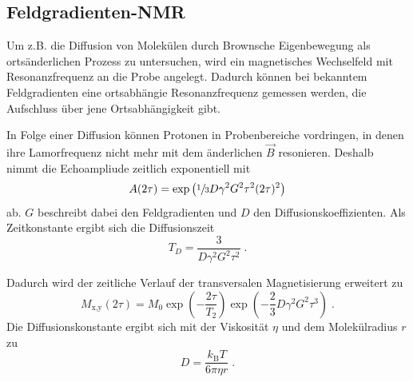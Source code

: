 \subsection{Feldgradienten-NMR}

Um z.B. die Diffusion von Molekülen durch Brownsche Eigenbewegung als ortsänderlichen Prozess zu untersuchen, 
wird ein magnetisches Wechselfeld mit Resonanzfrequenz an die Probe angelegt. Dadurch 
können bei bekanntem Feldgradienten eine ortsabhängie Resonanzfrequenz gemessen werden, die 
Aufschluss über jene Ortsabhängigkeit gibt.

In Folge einer Diffusion können Protonen in Probenbereiche vordringen, in denen ihre Lamorfrequenz nicht mehr
mit dem änderlichen $\vec{B}$ resonieren. Deshalb nimmt die Echoampliude zeitlich exponentiell mit
\begin{equation}
    A(2\tau) = \text{exp}\left(\sfrac{1}{3}D \gamma^2 G^2 \tau^2 (2\tau)^2 \right)
\end{equation}
ab. $G$ beschreibt dabei den Feldgradienten und $D$ den Diffusionskoeffizienten. Als Zeitkonstante
ergibt sich die Diffusionszeit 
\begin{equation}
    T_D = \frac{3}{D \gamma^2 G^2 \tau^2} \; .
\end{equation}

Dadurch wird der zeitliche Verlauf der transversalen Magnetisierung erweitert zu 
\begin{equation}
    M_\text{x,y} \left(2\tau\right) = M_0 \exp{\left(-\frac{2\tau}{T_2}\right)} \exp{\left(-\frac{2}{3}D\gamma^2G^2\tau^3\right)} \; .
    \label{eqn:DK}
\end{equation}
Die Diffusionskonstante ergibt sich mit der Viskosität $\eta$ und dem Molekülradius $r$ zu
\begin{equation}
    D = \frac{k_\text{B}T}{6\pi \eta r} \; .
\end{equation}
